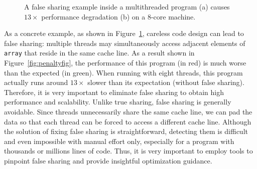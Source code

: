 
\begin{figure}[htbp]
\centering
{}%
\hspace{30pt}
\caption{
A false sharing example inside a multithreaded program (a) causes $13\times$ performance degradation (b) on a 8-core machine.
\label{fig:penalty}}
\end{figure}

As a concrete example, as shown in Figure~\ref{fig:penalty}, careless code design can lead to false sharing: multiple threads may simultaneously access adjacent elements of {\tt array} that reside in the same cache line. As a result shown in Figure~\ref{fig:penaltyfig},  the performance of this program (in red) is much worse than the expected (in green). When running with eight threads, this program actually runs around $13\times$ slower than its expectation (without false sharing).  Therefore, it is very important to eliminate false sharing to obtain high performance and scalability. 
Unlike true sharing, false sharing is generally avoidable. Since threads unnecessarily share the same cache line, we can pad the data so that  each thread can be forced to access a different cache line. Although the solution of fixing false sharing is straightforward, detecting them is difficult and even impossible with manual effort only, especially for a program with  thousands or millions lines of code. Thus, it is very important to employ tools to pinpoint false sharing and provide insightful optimization guidance.

